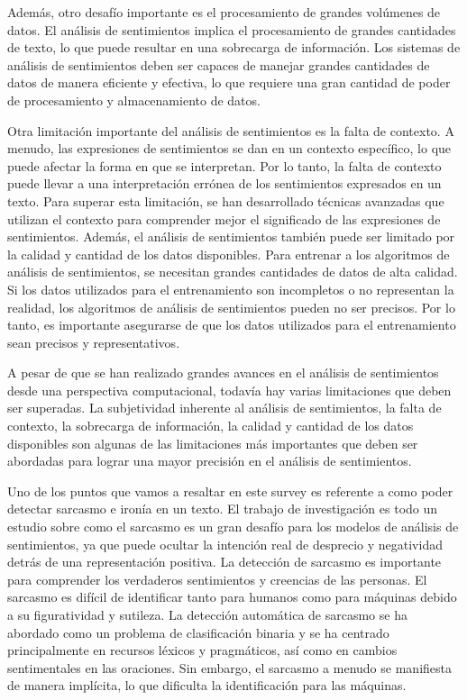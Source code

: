 \documentclass[conference]{IEEEtran}
\begin{document}
Además, otro desafío importante es el procesamiento de grandes volúmenes de datos. 
El análisis de sentimientos implica el procesamiento de grandes cantidades de texto, lo que puede resultar en una sobrecarga de información. 
Los sistemas de análisis de sentimientos deben ser capaces de manejar grandes cantidades de datos de manera eficiente y efectiva, lo que requiere una gran cantidad de poder de procesamiento y almacenamiento de datos.

Otra limitación importante del análisis de sentimientos es la falta de contexto. 
A menudo, las expresiones de sentimientos se dan en un contexto específico, lo que puede afectar la forma en que se interpretan. 
Por lo tanto, la falta de contexto puede llevar a una interpretación errónea de los sentimientos expresados en un texto. 
Para superar esta limitación, se han desarrollado técnicas avanzadas que utilizan el contexto para comprender mejor el significado de las expresiones de sentimientos. Además, el análisis de sentimientos también puede ser limitado por la calidad y cantidad de los datos disponibles. 
Para entrenar a los algoritmos de análisis de sentimientos, se necesitan grandes cantidades de datos de alta calidad. 
Si los datos utilizados para el entrenamiento son incompletos o no representan la realidad, los algoritmos de análisis de sentimientos pueden no ser precisos. 
Por lo tanto, es importante asegurarse de que los datos utilizados para el entrenamiento sean precisos y representativos.

A pesar de que se han realizado grandes avances en el análisis de sentimientos desde una perspectiva computacional, todavía hay varias limitaciones que deben ser superadas. 
La subjetividad inherente al análisis de sentimientos, la falta de contexto, la sobrecarga de información, la calidad y cantidad de los datos disponibles son algunas de las limitaciones más importantes que deben ser abordadas para lograr una mayor precisión en el análisis de sentimientos.

Uno de los puntos que vamos a resaltar en este survey es referente a como poder detectar sarcasmo e ironía en un texto. El trabajo de investigación \cite{b4} es todo un estudio sobre como el sarcasmo es un gran desafío para los modelos de análisis de sentimientos, ya que puede ocultar la intención real de desprecio y negatividad detrás de una representación positiva. La detección de sarcasmo es importante para comprender los verdaderos sentimientos y creencias de las personas. El sarcasmo es difícil de identificar tanto para humanos como para máquinas debido a su figuratividad y sutileza. La detección automática de sarcasmo se ha abordado como un problema de clasificación binaria y se ha centrado principalmente en recursos léxicos y pragmáticos, así como en cambios sentimentales en las oraciones. Sin embargo, el sarcasmo a menudo se manifiesta de manera implícita, lo que dificulta la identificación para las máquinas.
\end{document}
